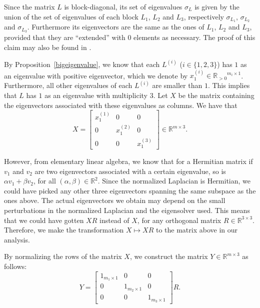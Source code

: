 Since the matrix $L$ is block-diagonal, its set of eigenvalues $\sigma _L$ is given by the union of the set of eigenvalues of each block $L_1$, $L_2$ and $L_3$, respectively $\sigma_{L_1}$, $\sigma_{L_2}$ and $\sigma_{L_3}$.
Furthermore its eigenvectors are the same as the ones of $L_1$, $L_2$ and $L_3$, provided that they are ``extended'' with $0$ elements as necessary. 
The proof of this claim may also be found in \cite{mahoney}.

By Proposition~\vref{bigeigenvalue}, we know that each $L^{(i)}$ ($i \in \{1, 2, 3 \}$) has $1$ as an eigenvalue with positive eigenvector, which we denote by $x_1^{(i)} \in {\mathbb R_{>0}}^{m_i \times 1} $. Furthermore, all other eigenvalues of each $L^{(i)}$ are smaller than $1$.
This implies that $L$ has $1$ as an eigenvalue with multiplicity $3$.
Let $X$ be the matrix containing the eigenvectors associated with these eigenvalues as columns. We have that 
\begin{equation}
   X =
   \begin{bmatrix}
      x_1^{(1)} & 0 & 0 \\
      0 & x_1^{(2)} & 0 \\
      0 & 0 & x_1^{(3)}
   \end{bmatrix}
   \in \mathbb R^{m \times 3}.
\end{equation}

However, from elementary linear algebra, we know that for a Hermitian matrix if $v_1$ and $v_2$ are two eigenvectors associated with a certain eigenvalue, so is $\alpha v_1 + \beta v_2$, for all $(\alpha, \beta) \in \mathbb R ^2$.
Since the normalized Laplacian is Hermitian, we could have picked any other three eigenvectors spanning the same subspace as the ones above.
The actual eigenvectors we obtain may depend on the small perturbations in the normalized Laplacian and the eigensolver used.
This means that we could have gotten $XR$ instead of $X$, for any orthogonal matrix $R \in \mathbb{R}^{3 \times 3}$.
Therefore, we make the transformation $X \longmapsto XR$ to the matrix above in our analysis.

By normalizing the rows of the matrix $X$, we construct the matrix $Y \in \mathbb{R}^{m \times 3}$ as follows:
\begin{equation}\label{y}
   Y = 
   \begin{bmatrix}
      1_{m_1 \times 1} & 0 & 0 \\
      0 & 1_{m_2 \times 1} & 0 \\
      0 & 0 & 1_{m_3 \times 1} 
   \end{bmatrix}R.
\end{equation}

